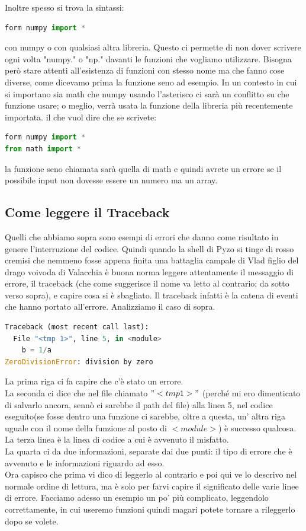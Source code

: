 \documentclass[10pt,a4paper]{article}
\begin{document}
Inoltre spesso si trova la sintassi:
\begin{lstlisting}[language=Python]
form numpy import *
\end{lstlisting}
con numpy o con qualsiasi altra libreria. Questo ci permette di non dover scrivere ogni volta "numpy." o "np." davanti le funzioni che vogliamo utilizzare. Bisogna però stare attenti all'esistenza di funzioni con stesso nome ma che fanno cose diverse, come dicevamo prima la funzione seno ad esempio. In un contesto in cui si importano sia math che numpy usando l'asterisco ci sarà un conflitto su che funzione usare; o meglio, verrà usata la funzione della libreria più recentemente importata. il che vuol dire che se scrivete:
\begin{lstlisting}[language=Python]
form numpy import *
from math import *
\end{lstlisting}
la funzione seno chiamata sarà quella di math e quindi avrete un errore se il possibile input non dovesse essere un numero ma un array.

\subsection{Come leggere il Traceback}
Quelli che abbiamo sopra sono esempi di errori che danno come risultato in genere l'interruzione del codice. Quindi quando la shell di Pyzo si tinge di rosso cremisi che nemmeno fosse appena finita una battaglia campale di Vlad figlio del drago voivoda di Valacchia è buona norma leggere attentamente il messaggio di errore, il traceback (che come suggerisce il nome va letto al contrario; da sotto verso sopra), e capire cosa si è sbagliato. Il traceback infatti è la catena di eventi che hanno portato all'errore. Analizziamo il caso di sopra.

\begin{lstlisting}[language=Python]
Traceback (most recent call last):
  File "<tmp 1>", line 5, in <module>
    b = 1/a
ZeroDivisionError: division by zero
\end{lstlisting}
La prima riga ci fa capire che c'è stato un errore. \\
La seconda ci dice che nel file chiamato $"<tmp 1>"$ (perché mi ero dimenticato di salvarlo ancora, sennò ci sarebbe il path del file) alla linea 5, nel codice eseguito(se fosse dentro una funzione ci sarebbe, oltre a questa, un' altra riga uguale con il nome della funzione al posto di $<module>$) è successo qualcosa.\\
La terza linea è la linea di codice a cui è avvenuto il misfatto.\\
La quarta ci da due informazioni, separate dai due punti: il tipo di errore che è avvenuto e le informazioni riguardo ad esso.\\
Ora capisco che prima vi dico di leggerlo al contrario e poi qui ve lo descrivo nel normale ordine di lettura, ma è solo per farvi capire il significato delle varie linee di errore.
Facciamo adesso un esempio un po' più complicato, leggendolo correttamente, in cui useremo funzioni quindi magari potete tornare a rileggerlo dopo se volete.
\end{document}
